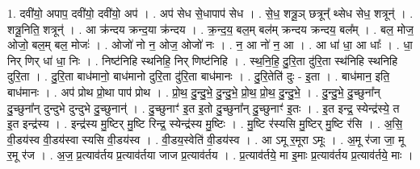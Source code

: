 \documentclass[17pt]{extarticle}
\begin{document}
1. दवी॑यो॒ अपाप॒ दवी॑यो॒ दवी॑यो॒ अप॑ । . अप॑ सेध से॒धापाप॑ सेध । . से॒ध॒ शत्रू॒ञ् छत्रून्᳚ थ्सेध सेध॒ शत्रून्॑ । . शत्रू॒निति॒ शत्रून्॑ । . आ क्र॑न्दय क्रन्द॒या क्र॑न्दय । . क्र॒न्द॒य॒ बल॒म् बल॑म् क्रन्दय क्रन्दय॒ बल᳚म् । . बल॒ मोज॒ ओजो॒ बल॒म् बल॒ मोजः॑ । . ओजो॑ नो न॒ ओज॒ ओजो॑ नः । . न॒ आ नो॑ न॒ आ । . आ धा॑ धा॒ आ धाः᳚ । . धा॒ निर् णिर् धा॑ धा॒ निः । . निष्ट॑निहि स्थनिहि॒ निर् णिष्ट॑निहि । . स्थ॒नि॒हि॒ दु॒रि॒ता दु॑रि॒ता स्थ॑निहि स्थनिहि दुरि॒ता । . दु॒रि॒ता बाध॑मानो॒ बाध॑मानो दुरि॒ता दु॑रि॒ता बाध॑मानः । . दु॒रि॒तेति॑ दुः - इ॒ता । . बाध॑मान॒ इति॒ बाध॑मानः । . अप॑ प्रोथ प्रो॒था पाप॑ प्रोथ । . प्रो॒थ॒ दु॒न्दु॒भे॒ दु॒न्दु॒भे॒ प्रो॒थ॒ प्रो॒थ॒ दु॒न्दु॒भे॒ । . दु॒न्दु॒भे॒ दु॒च्छुना᳚न् दु॒च्छुना᳚न् दुन्दुभे दुन्दुभे दु॒च्छुनान्॑ । . दु॒च्छुनाꣳ॑ इ॒त इ॒तो दु॒च्छुना᳚न् दु॒च्छुनाꣳ॑ इ॒तः । . इ॒त इन्द्र॒ स्येन्द्र॑स्ये॒ त इ॒त इन्द्र॑स्य । . इन्द्र॑स्य मु॒ष्टिर् मु॒ष्टि रिन्द्र॒ स्येन्द्र॑स्य मु॒ष्टिः । . मु॒ष्टि र॑स्यसि मु॒ष्टिर् मु॒ष्टि र॑सि । . अ॒सि॒ वी॒डय॑स्व वी॒डय॑स्वा स्यसि वी॒डय॑स्व । . वी॒डय॒स्वेति॑ वी॒डय॑स्व । . आ ऽमू र॒मूरा ऽमूः । . अ॒मू र॑जा जा॒ मू र॒मू र॑ज । . अ॒ज॒ प्र॒त्याव॑र्तय प्र॒त्याव॑र्तया जाज प्र॒त्याव॑र्तय । . प्र॒त्याव॑र्तये॒ मा इ॒माः प्र॒त्याव॑र्तय प्र॒त्याव॑र्तये॒ माः । \newline
\end{document}
